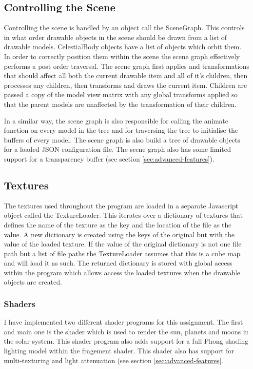 \documentclass[paper=a4, fontsize=11pt]{scrartcl}	%
\numberwithin{equation}{section}															%
\numberwithin{figure}{section}																%
\numberwithin{table}{section}																%
\begin{document}
\subsection{Controlling the Scene}
Controlling the scene is handled by an object call the SceneGraph. This controls in what order drawable objects in the scene should be drawn from a list of drawable models. CelestialBody objects have a list of objects which orbit them. In order to correctly position them within the scene the scene graph effectively performs a post order traversal. The scene graph first applies and transformations that should affect all both the current drawable item and all of it's children, then processes any children, then transforms and draws the current item. Children are passed a copy of the model view matrix with any global transforms applied so that the parent models are unaffected by the transformation of their children.

In a similar way, the scene graph is also responsible for calling the animate function on every model in the tree and for traversing the tree to initialise the buffers of every model. The scene graph is also build a tree of drawable objects for a loaded JSON configuration file. The scene graph also has some limited support for a transparency buffer (see section \ref{sec:advanced-features}).

\subsection{Textures}
The textures used throughout the program are loaded in a separate Javascript object called the TextureLoader. This iterates over a dictionary of textures that defines the name of the texture as the key and the location of the file as the value. A new dictionary is created using the keys of the original but with the value of the loaded texture. If the value of the original dictionary is not one file path but a list of file paths the TextureLoader assumes that this is a cube map and will load it as such. The returned dictionary is stored with global access within the program which allows access the loaded textures when the drawable objects are created.

\subsubsection{Shaders}
I have implemented two different shader programs for this assignment. The first and main one is the shader which is used to render the sun, planets and moons in the solar system. This shader program also adds support for a full Phong shading lighting model within the fragement shader. This shader also has support for multi-texturing and light attenuation (see section \ref{sec:advanced-features}.
\end{document}
